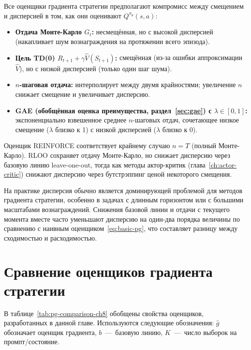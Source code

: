 Все оценщики градиента стратегии предполагают компромисс между смещением и дисперсией в том, как они оценивают $Q^{\pi_\theta}(s,a)$:
\begin{itemize}[leftmargin=*]
\item \textbf{Отдача Монте-Карло $G_t$:} несмещённая, но с высокой дисперсией (накапливает шум вознаграждения на протяжении всего эпизода).
\item \textbf{Цель TD(0) $R_{t+1} + \gamma \hat V(S_{t+1})$:} смещённая (из-за ошибки аппроксимации $\hat V$), но с низкой дисперсией (только один шаг шума).
\item \textbf{$n$-шаговая отдача:} интерполирует между двумя крайностями; увеличение $n$ снижает смещение и увеличивает дисперсию.
\item \textbf{GAE (обобщённая оценка преимущества, раздел~\ref{sec:gae}) с $\lambda \in [0,1]$:} экспоненциально взвешенное среднее $n$-шаговых отдач, сочетающее низкое смещение ($\lambda$ близко к 1) с низкой дисперсией ($\lambda$ близко к 0).
\end{itemize}

Оценщик REINFORCE соответствует крайнему случаю $n = T$ (полный Монте-Карло). RLOO сохраняет отдачу Монте-Карло, но снижает дисперсию через базовую линию leave-one-out, тогда как методы актор-критик (глава~\ref{ch:actor-critic}) снижают дисперсию через бутстрэппинг ценой некоторого смещения.

\begin{remark}
\label{rem:variance-dominates}
На практике дисперсия обычно является доминирующей проблемой для методов градиента стратегии, особенно в задачах с длинным горизонтом или с большими масштабами вознаграждений. Снижения базовой линии и отдачи с текущего момента вместе часто уменьшают дисперсию на один-два порядка величины по сравнению с наивным оценщиком~\eqref{eq:basic-pg}, что составляет разницу между сходимостью и расходимостью.
\end{remark}

\section{Сравнение оценщиков градиента стратегии}
\label{sec:pg-comparison}


В таблице~\ref{tab:pg-comparison-ch8} обобщены свойства оценщиков, разработанных в данной главе. Используются следующие обозначения: $\hat g$ обозначает оценщик градиента, $b$ \,---\, базовую линию, $K$ \,---\, число выборок на промпт/состояние.

